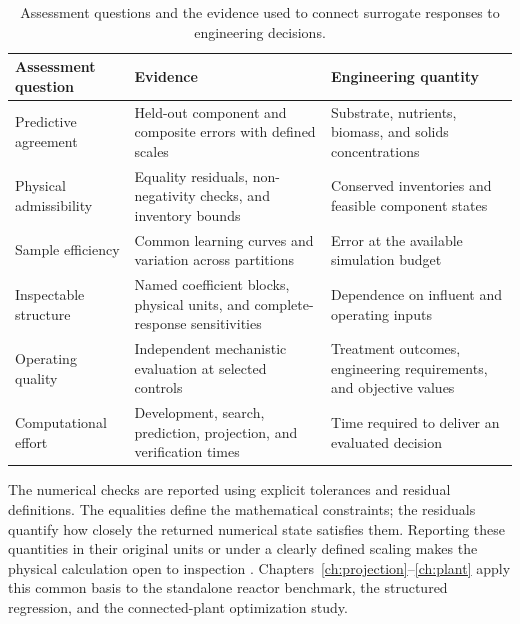 \begin{table}[htbp]
\centering\small
\caption{Assessment questions and the evidence used to connect surrogate responses to engineering decisions.}
\label{tab:claim_evidence}
\begin{tabular}{>{\raggedright\arraybackslash}p{}>{\raggedright\arraybackslash}p{}>{\raggedright\arraybackslash}p{}}
\toprule
Assessment question & Evidence & Engineering quantity\\
\midrule
Predictive agreement & Held-out component and composite errors with defined scales & Substrate, nutrients, biomass, and solids concentrations\\
Physical admissibility & Equality residuals, non-negativity checks, and inventory bounds & Conserved inventories and feasible component states\\
Sample efficiency & Common learning curves and variation across partitions & Error at the available simulation budget\\
Inspectable structure & Named coefficient blocks, physical units, and complete-response sensitivities & Dependence on influent and operating inputs\\
Operating quality & Independent mechanistic evaluation at selected controls & Treatment outcomes, engineering requirements, and objective values\\
Computational effort & Development, search, prediction, projection, and verification times & Time required to deliver an evaluated decision\\
\bottomrule
\end{tabular}
\end{table}

The numerical checks are reported using explicit tolerances and residual definitions. The equalities define the mathematical constraints; the residuals quantify how closely the returned numerical state satisfies them. Reporting these quantities in their original units or under a clearly defined scaling makes the physical calculation open to inspection \citep{Boyd2004,BuzziFerraris2013}. Chapters~\ref{ch:projection}--\ref{ch:plant} apply this common basis to the standalone reactor benchmark, the structured regression, and the connected-plant optimization study.